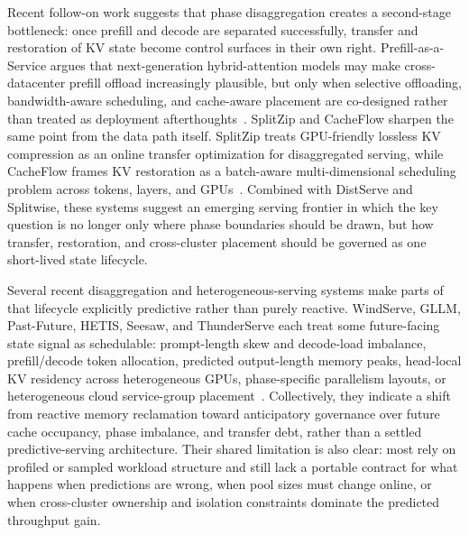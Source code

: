 \documentclass[acmsmall,screen,review]{acmart}
\begin{document}
Recent follow-on work suggests that phase disaggregation creates a second-stage bottleneck: once prefill and decode are separated successfully, transfer and restoration of KV state become control surfaces in their own right. Prefill-as-a-Service argues that next-generation hybrid-attention models may make cross-datacenter prefill offload increasingly plausible, but only when selective offloading, bandwidth-aware scheduling, and cache-aware placement are co-designed rather than treated as deployment afterthoughts~\cite{qin2026prfaas}. SplitZip and CacheFlow sharpen the same point from the data path itself. SplitZip treats GPU-friendly lossless KV compression as an online transfer optimization for disaggregated serving, while CacheFlow frames KV restoration as a batch-aware multi-dimensional scheduling problem across tokens, layers, and GPUs~\cite{guo2026splitzip,nian2026cacheflow}. Combined with DistServe and Splitwise, these systems suggest an emerging serving frontier in which the key question is no longer only where phase boundaries should be drawn, but how transfer, restoration, and cross-cluster placement should be governed as one short-lived state lifecycle.

Several recent disaggregation and heterogeneous-serving systems make parts of that lifecycle explicitly predictive rather than purely reactive. WindServe, GLLM, Past-Future, HETIS, Seesaw, and ThunderServe each treat some future-facing state signal as schedulable: prompt-length skew and decode-load imbalance, prefill/decode token allocation, predicted output-length memory peaks, head-local KV residency across heterogeneous GPUs, phase-specific parallelism layouts, or heterogeneous cloud service-group placement~\cite{windserve2025,guo2025gllm,gong2025pastfuture,mo2025hetis,su2025seesaw,jiang2025thunderserve}. Collectively, they indicate a shift from reactive memory reclamation toward anticipatory governance over future cache occupancy, phase imbalance, and transfer debt, rather than a settled predictive-serving architecture. Their shared limitation is also clear: most rely on profiled or sampled workload structure and still lack a portable contract for what happens when predictions are wrong, when pool sizes must change online, or when cross-cluster ownership and isolation constraints dominate the predicted throughput gain.
\end{document}
